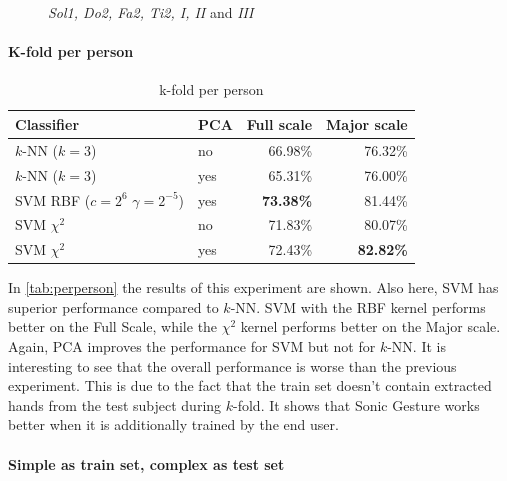 \begin{figure}[tb]
\hspace{0.03\linewidth}
\caption{\emph{Sol1, Do2, Fa2, Ti2, I, II} and \emph{III}}
\label{fig:goodhands}
\end{figure}


\paragraph{K-fold per person}

\begin{table}
\centering
\begin{tabular}{llrr}
\hline\hline
 Classifier & PCA	& Full scale	& Major scale \\
\hline
$k$-NN ($k=3$) &	no	& 66.98\% & 76.32\%	\\
$k$-NN ($k=3$) &	yes	& 65.31\% & 76.00\%	\\
SVM RBF ($c=2^6$ $\gamma=2^{-5}$) & yes & \textbf{73.38\%} & 81.44\%	\\
SVM $\chi^2$ &	no	&  71.83\% & 80.07\% \\
SVM $\chi^2$ &	yes	&  72.43\% & \textbf{82.82\%} \\
\hline
\end{tabular}
\caption{k-fold per person}
\label{tab:perperson}
\end{table}


In \autoref{tab:perperson} the results of this experiment are shown. Also here, SVM has superior performance compared to $k$-NN. SVM with the RBF kernel performs better on the Full Scale, while the $\chi^2$ kernel performs better on the Major scale. Again, PCA improves the performance for SVM but not for $k$-NN. It is interesting to see that the overall performance is worse than the previous experiment. This is due to the fact that the train set doesn't contain extracted hands from the test subject during $k$-fold. It shows that Sonic Gesture works better when it is additionally trained by the end user.

\paragraph{Simple as train set, complex as test set}


